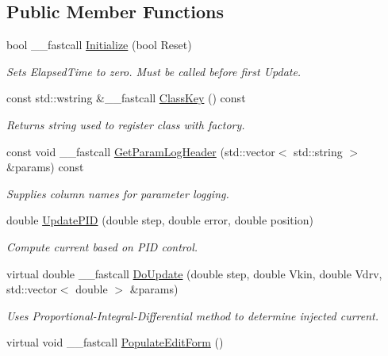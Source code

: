 \subsection*{Public Member Functions}
\begin{DoxyCompactItemize}
\item 
bool \+\_\+\+\_\+fastcall \hyperlink{class_t_voltage_clamp___p_i_d___current_a36cfc961ad7b9440318f73fe2ef23e55}{Initialize} (bool Reset)
\begin{DoxyCompactList}\small\item\em Sets Elapsed\+Time to zero. Must be called before first Update. \end{DoxyCompactList}\item 
const std\+::wstring \&\+\_\+\+\_\+fastcall \hyperlink{class_t_voltage_clamp___p_i_d___current_a7be7d4e60396298cad6617d0ab6cfd34}{Class\+Key} () const 
\begin{DoxyCompactList}\small\item\em Returns string used to register class with factory. \end{DoxyCompactList}\item 
const void \+\_\+\+\_\+fastcall \hyperlink{class_t_voltage_clamp___p_i_d___current_aaee131d46d549beb65a598df66a73965}{Get\+Param\+Log\+Header} (std\+::vector$<$ std\+::string $>$ \&params) const 
\begin{DoxyCompactList}\small\item\em Supplies column names for parameter logging. \end{DoxyCompactList}\item 
double \hyperlink{class_t_voltage_clamp___p_i_d___current_a08ef5d1014ae6a1575988185bbcfa0af}{Update\+P\+I\+D} (double step, double error, double position)
\begin{DoxyCompactList}\small\item\em Compute current based on P\+I\+D control. \end{DoxyCompactList}\item 
virtual double \+\_\+\+\_\+fastcall \hyperlink{class_t_voltage_clamp___p_i_d___current_af90e17c7b0f0dbc81040bdc99de4a6e8}{Do\+Update} (double step, double Vkin, double Vdrv, std\+::vector$<$ double $>$ \&params)
\begin{DoxyCompactList}\small\item\em Uses Proportional-\/\+Integral-\/\+Differential method to determine injected current. \end{DoxyCompactList}\item 
\hypertarget{class_t_voltage_clamp___p_i_d___current_ab420c1ac0df81fe6fcb3ff1a0bf395ea}{virtual void \+\_\+\+\_\+fastcall \hyperlink{class_t_voltage_clamp___p_i_d___current_ab420c1ac0df81fe6fcb3ff1a0bf395ea}{Populate\+Edit\+Form} ()}\label{class_t_voltage_clamp___p_i_d___current_ab420c1ac0df81fe6fcb3ff1a0bf395ea}


\end{DoxyCompactItemize}
